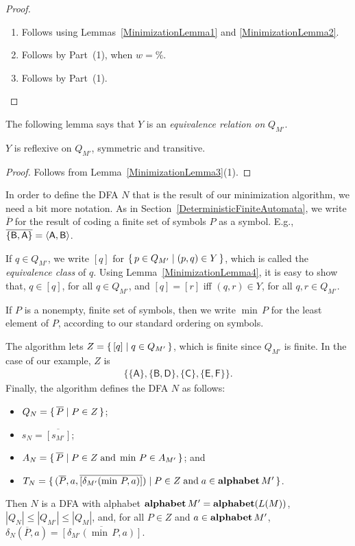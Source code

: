\begin{proof}
\begin{enumerate}[\quad(1)]
\item Follows using Lemmas~\ref{MinimizationLemma1} and
  \ref{MinimizationLemma2}.

\item Follows by Part~(1), when $w=\%$.

\item Follows by Part~(1).
\end{enumerate}
\end{proof}

The following lemma says that $Y$ is an \emph{equivalence relation on}
$Q_{M'}$.

\begin{lemma}
\label{MinimizationLemma4}
$Y$ is reflexive on $Q_{M'}$, symmetric and transitive.
\end{lemma}

\begin{proof}
Follows from Lemma~\ref{MinimizationLemma3}(1).
\end{proof}

In order to define the DFA $N$ that is the result of our minimization
algorithm, we need a bit more notation.  As in
Section~\ref{DeterministicFiniteAutomata}, we write $\overline{P}$ for
the result of coding a finite set of symbols $P$ as a symbol.  E.g.,
$\overline{\{\mathsf{B},\mathsf{A}\}} = \langle\mathsf{A},\mathsf{B}\rangle$.

If $q\in Q_{M'}$, we write $[q]$ for $\{ \, p\in Q_{M'} \mid (p,q)\in
  Y \, \}$, which is called the \emph{equivalence class} of $q$.  Using
Lemma~\ref{MinimizationLemma4}, it is easy to show that, $q\in[q]$,
for all $q\in Q_{M'}$, and $[q]=[r]$ iff $(q,r)\in Y$, for all $q,r\in
Q_{M'}$.

If $P$ is a nonempty, finite set of symbols, then we write $\min\,P$
for the least element of $P$, according to our standard ordering on
symbols.

The algorithm lets $Z=\{ \, [q] \mid q\in Q_{M'} \, \}$, which is finite since
$Q_{M'}$ is finite.
In the case of our example, $Z$ is
\begin{gather*}
\mathsf{\{\{A\}, \{B,D\}, \{C\}, \{E,F\}\}} .
\end{gather*}
Finally, the algorithm defines the DFA $N$ as follows:
\begin{itemize}
\item $Q_N = \{ \, \overline{P} \mid P\in Z \, \}$;

\item $s_N = \overline{[s_{M'}]}$;

\item $A_N = \{ \, \overline{P} \mid P\in Z\;\allowbreak\mbox{and}\allowbreak\;\min\,P\in
 A_{M'} \, \}$; and

\item $T_N = \setof{(\overline{P},a,
{\overline{[\delta_{M'}(\min\,P,a)]}})}%
{P\in Z\eqtxt{and}a\in\alphabet\,M'}$.
\end{itemize}
Then $N$ is a DFA with alphabet
$\mathbf{alphabet}\,M'=\mathbf{alphabet}(L(M))$, $|Q_N|\leq|Q_{M'}|\leq|Q_M|$, and,
for all $P\in Z$ and $a\in\mathbf{alphabet}\,M'$,
$\delta_N(\overline{P},a)= \overline{[\delta_{M'}(\min\,P,a)]}$.

